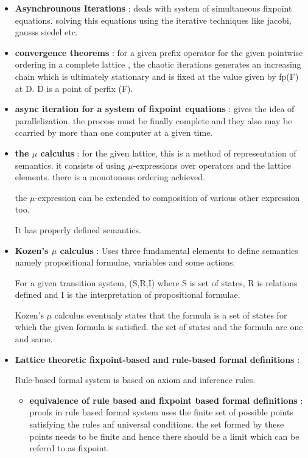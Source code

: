 \begin{itemize}
	\item{\textbf{Asynchrounous Iterations} :
	deals with system of simultaneous fixpoint equations. solving this equations using the iterative techniques like jacobi, gausss siedel etc.
	}

	\item{\textbf{convergence theorems} : for a given prefix operator for the given pointwise ordering in a complete lattice , the chaotic iterations generates an increasing chain which is ultimately stationary and is fixed at the value given by fp(F) at D. D is a point of perfix (F).
	}

	\item{\textbf{async iteration for a system of fixpoint equations} :
	gives the idea of parallelization. the process must be finally complete and they also may be ccarried by more than one computer at a given time.
	}

	\item{\textbf{the $\mu$ calculus} : for the given lattice, this is a method of representation of semantics. it consists of using $\mu$-expressions over operators and the lattice elements. there is a monotonous ordering achieved.

	the $\mu$-expression can be extended to composition of various other expression too. 

	It has properly defined semantics.
	}
	
	\item{\textbf{Kozen's $\mu$ calculus} : Uses three fundamental elements to define semantics namely propositional formulae, variables and some actions.

	For a given transition system, (S,R,I) where S is set of states, R is relations defined and	I is the interpretation of propositional formulae.

	Kozen's $\mu$ calculus eventualy states that the formula is a set of states for which the given formula is satisfied. the set of states and the formula are one and same.

	}

	\item{\textbf{Lattice theoretic fixpoint-based and rule-based formal definitions} :

	Rule-based formal system is based on axiom and inference rules.

	\begin{itemize}
		\item{\textbf{equivalence of rule based and fixpoint based formal definitions} : proofs in rule based formal system uses the finite set of possible points satisfying the rules anf universal conditions. the set formed by these points needs to be finite and hence there should be a limit which can be referrd to as fixpoint.

}
\end{itemize}}
\end{itemize}
